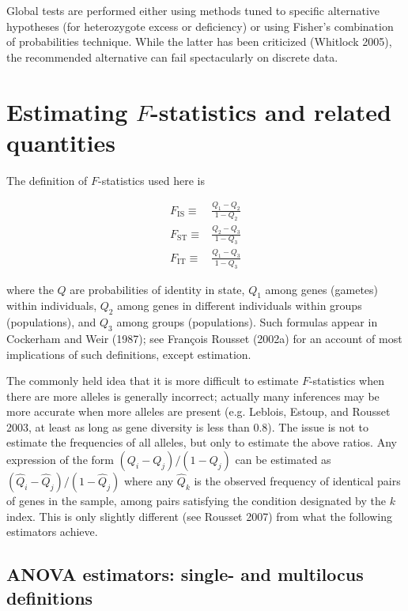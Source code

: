 \documentclass[12pt,]{book}
\begin{document}
Global tests are performed either using methods tuned to specific
alternative hypotheses (for heterozygote excess or deficiency) or using
Fisher's combination of probabilities technique. While the latter has
been criticized (Whitlock 2005), the recommended alternative can fail
spectacularly on discrete data.

\section{\texorpdfstring{Estimating \(F\)-statistics and related
quantities}{Estimating F-statistics and related quantities}}\label{estimating-f-statistics-and-related-quantities}

The definition of
\(F\)-statistics used here
is

\[\begin{aligned}
 {F_\mathrm{IS}}\equiv &\frac{Q_1-Q_2}{1-Q_2}\\
 {F_\mathrm{ST}}\equiv &\frac{Q_2-Q_3}{1-Q_3}\\
 {F_\mathrm{IT}}\equiv &\frac{Q_1-Q_3}{1-Q_3}
 \end{aligned}\]

where the \(Q\) are probabilities of identity in state, \(Q_1\) among
genes (gametes) within individuals, \(Q_2\) among genes in different
individuals within groups (populations), and \(Q_3\) among groups
(populations). Such formulas appear in Cockerham and Weir (1987); see
François Rousset (2002a) for an account of most implications of such
definitions, except estimation.

The commonly held idea that it is more difficult to estimate
\(F\)-statistics when there are more alleles is generally incorrect;
actually many inferences may be more accurate when more alleles are
present (e.g. Leblois, Estoup, and Rousset 2003, at least as long as
gene diversity is less than 0.8). The issue is not to estimate the
frequencies of all alleles, but only to estimate the above
ratios. Any
expression of the form \((Q_i-Q_j)/(1-Q_j)\) can be estimated as
\((\hat{Q}_i-\hat{Q}_j)/(1-\hat{Q}_j)\) where any \(\hat{Q}_k\) is the
observed frequency of identical pairs of genes in the sample, among
pairs satisfying the condition designated by the \(k\) index. This is
only slightly different (see Rousset 2007) from what the following
estimators achieve.

\subsection{ANOVA estimators: single- and multilocus
definitions}\label{Fmulti}
\end{document}
